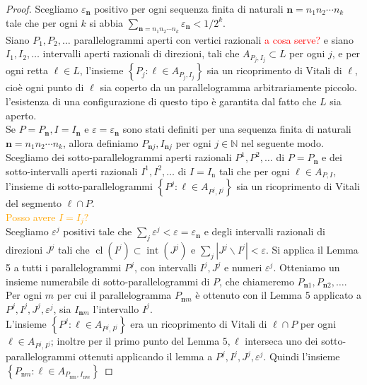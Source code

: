 \documentclass[a4paper, twoside,openright]{article}
\newcommand{\<}{\langle}
\renewcommand{\>}{\rangle}
\begin{document}
\begin{proof}
Scegliamo $\varepsilon_{\mathbf{n}}$ positivo per ogni sequenza finita di naturali $\mathbf{n}=n_{1} n_{2} \cdots n_{k}$ tale che per ogni $k$ si abbia $\sum_{\mathbf{n}=n_{1} n_{2} \cdots n_{k}} \varepsilon_{\mathbf{n}}<1 / 2^{k}$.\\
Siano $P_{1}, P_{2}, \ldots$ parallelogrammi aperti con vertici razionali \textcolor{red}{a cosa serve?} e siano $I_{1}, I_{2}, \ldots$ intervalli aperti razionali di direzioni, tali che $A_{P_{j}, I_{j}} \subset L$ per ogni $j$, e per ogni retta $\ell \in L$, l'insieme $\left\{P_{j}: \ell \in A_{P_{j}, I_{j}}\right\}$ sia un ricoprimento di Vitali di $\ell$, cioè ogni punto di $\ell$ sia coperto da un parallelogramma arbitrariamente piccolo. l'esistenza di una configurazione di questo tipo è garantita dal fatto che $L$ sia aperto.\\
Se $P=P_{\mathbf{n}}, I=I_{\mathbf{n}}$ e $\varepsilon=\varepsilon_{\mathbf{n}}$ sono stati definiti per una sequenza finita di naturali $\mathbf{n}=n_{1} n_{2} \cdots n_{k}$, allora definiamo $P_{\mathbf{n} j}, I_{\mathbf{n} j}$ per ogni $j \in \mathbb{N}$ nel seguente modo.\\
Scegliamo dei sotto-parallelogrammi aperti razionali $P^{1}, P^{2}, \ldots$ di $P=P_{\mathbf{n}}$ e dei sotto-intervalli aperti razionali $I^{1}, I^{2}, \ldots$ di $I=I_{\mathrm{n}}$ tali che per ogni $\ell \in A_{P, I}$, l'insieme di sotto-parallelogrammi $\left\{P^{j}: \ell \in A_{P^{j}, I^{j}}\right\}$
sia un ricoprimento di Vitali del segmento $\ell \cap P$. \\
\textcolor{orange}{Posso avere $I=I_j?$}\\
Scegliamo $\varepsilon^{j}$ positivi tale che $\sum_{j} \varepsilon^{j}<\varepsilon=\varepsilon_{\mathbf{n}}$ e degli intervalli razionali di direzioni $J^{j}$ tali che $\operatorname{cl}\left(I^{j}\right) \subset \operatorname{int}\left(J^{j}\right)$ e $\sum_{j}\left|J^{j} \backslash I^{j}\right|<\varepsilon$. Si applica il Lemma 5 a tutti i parallelogrammi $P^{j}$, con intervalli $I^{j}, J^{j}$ e numeri $\varepsilon^{j}$. Otteniamo un insieme numerabile di sotto-parallelogrammi di $P$, che chiameremo $P_{\mathbf{n} 1}, P_{\mathbf{n} 2}, \ldots$. Per ogni $m$ per cui il parallelogramma $P_{\mathbf{n} m}$ è ottenuto con il Lemma 5 applicato a $P^{j}, I^{j}, J^{j}, \varepsilon^{j}$, sia $I_{\mathbf{n} m}$ l'intervallo $I^{j}$.\\
L'insieme $\left\{P^{j}: \ell \in A_{P^{j}, I^{j}}\right\}$ era un ricoprimento di Vitali di $\ell \cap P$ per ogni $\ell \in A_{P^{j}, I^{j}}$; inoltre per il primo punto del Lemma $5, \ell$ interseca uno dei sotto-parallelogrammi ottenuti applicando il lemma a $P^{j}, I^{j}, J^{j}, \varepsilon^{j}$. Quindi l'insieme $\left\{P_{\mathrm{n} m}: \ell \in A_{P_{\mathrm{nm}}, I_{\mathrm{n} m}}\right\}$

\end{proof}
\end{document}
